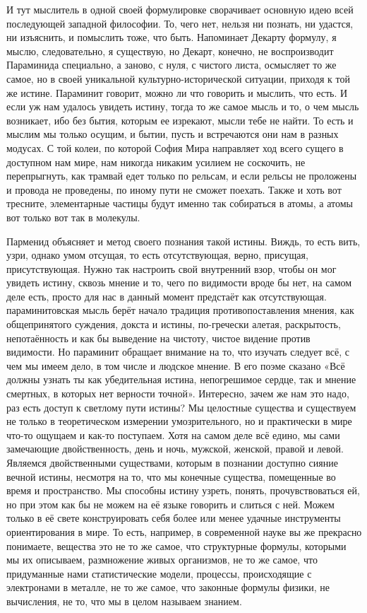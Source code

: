И тут мыслитель в одной своей формулировке сворачивает
основную идею всей последующей западной философии. То, чего нет, нельзя ни
познать, ни удастся, ни изъяснить, и помыслить тоже, что быть. Напоминает
Декарту формулу, я мыслю, следовательно, я существую, но Декарт, конечно, не
воспроизводит Параминида специально, а заново, с нуля, с чистого листа,
осмысляет то же самое, но в своей уникальной культурно-исторической ситуации,
приходя к той же истине. Параминит говорит, можно ли что говорить и мыслить, что
есть. И если уж нам удалось увидеть истину, тогда то же самое мысль и то, о чем
мысль возникает, ибо без бытия, которым ее изрекают, мысли тебе не найти. То
есть и мыслим мы только осущим, и бытии, пусть и встречаются они нам в разных
модусах. С той колеи, по которой София Мира направляет ход всего сущего в
доступном нам мире, нам никогда никаким усилием не соскочить, не перепрыгнуть,
как трамвай едет только по рельсам, и если рельсы не проложены и провода не
проведены, по иному пути не сможет поехать. Также и хоть вот тресните,
элементарные частицы будут именно так собираться в атомы, а атомы вот только вот
так в молекулы. 

Парменид объясняет и метод своего познания такой истины. Виждь,
то есть вить, узри, однако умом отсущая, то есть отсутствующая, верно, присущая,
присутствующая. Нужно так настроить свой внутренний взор, чтобы он мог увидеть
истину, сквозь мнение и то, чего по видимости вроде бы нет, на самом деле есть,
просто для нас в данный момент предстаёт как отсутствующая. параминитовская
мысль берёт начало традиция противопоставления мнения, как общепринятого
суждения, докста и истины, по-гречески алетая, раскрытость, непотаённость и как
бы выведение на чистоту, чистое видение против видимости. Но параминит обращает
внимание на то, что изучать следует всё, с чем мы имеем дело, в том числе и
людское мнение. В его поэме сказано «Всё должны узнать ты как убедительная
истина, непогрешимое сердце, так и мнение смертных, в которых нет верности
точной». Интересно, зачем же нам это надо, раз есть доступ к светлому пути
истины? Мы целостные существа и существуем не только в теоретическом измерении
умозрительного, но и практически в мире что-то ощущаем и как-то поступаем. Хотя
на самом деле всё едино, мы сами замечающие двойственность, день и ночь,
мужской, женской, правой и левой. Являемся двойственными существами, которым в
познании доступно сияние вечной истины, несмотря на то, что мы конечные
существа, помещенные во время и пространство. Мы способны истину узреть, понять,
прочувствоваться ей, но при этом как бы не можем на её языке говорить и слиться
с ней. Можем только в её свете конструировать себя более или менее удачные
инструменты ориентирования в мире. 
То есть, например, в современной науке вы же
прекрасно понимаете, вещества это не то же самое, что структурные формулы,
которыми мы их описываем, размножение живых организмов, не то же самое, что
придуманные нами статистические модели, процессы, происходящие с электронами в
металле, не то же самое, что законные формулы физики, не вычисления, не то, что
мы в целом называем знанием. 

